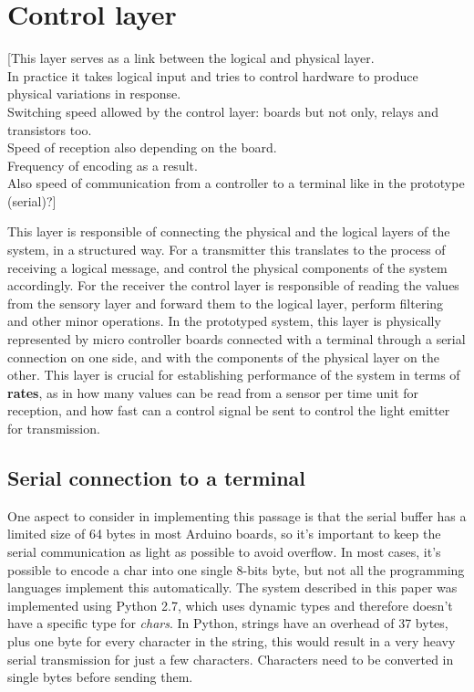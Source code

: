 \section{Control layer}
[This layer serves as a link between the logical and physical layer.\\
In practice it takes logical input and tries to control hardware to produce physical variations in response.\\
Switching speed allowed by the control layer: boards but not only, relays and transistors too.\\
Speed of reception also depending on the board.\\
Frequency of encoding as a result.\\
Also speed of communication from a controller to a terminal like in the prototype (serial)?]

This layer is responsible of connecting the physical and the logical layers of the system, in a structured way.
For a transmitter this translates to the process of receiving a logical message, and control the physical components of the system accordingly.
For the receiver the control layer is responsible of reading the values from the sensory layer and forward them to the logical layer, perform filtering and other minor operations.
In the prototyped system, this layer is physically represented by micro controller boards connected with a terminal through a serial connection on one side, and with the components of the physical layer on the other.
This layer is crucial for establishing performance of the system in terms of \textbf{rates}, as in how many values can be read from a sensor per time unit for reception, and how fast can a control signal be sent to control the light emitter for transmission.

\subsection{Serial connection to a terminal}
One aspect to consider in implementing this passage is that the serial buffer has a limited size of 64 bytes in most Arduino boards, so it's important to keep the serial communication as light as possible to avoid overflow. In most cases, it's possible to encode a char into one single 8-bits byte, but not all the programming languages implement this automatically.
The system described in this paper was implemented using Python 2.7, which uses dynamic types and therefore doesn't have a specific type for \textit{chars}. In Python, strings have an overhead of 37 bytes, plus one byte for every character in the string, this would result in a very heavy serial transmission for just a few characters. Characters need to be converted in single bytes before sending them. 

